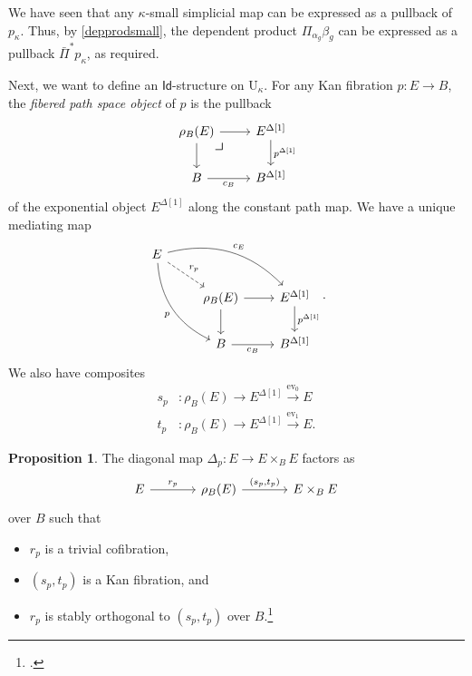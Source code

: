 \documentclass[10pt,letterpaper,cm]{nupset}
\theoremstyle{definition}
\theoremstyle{theorem}
\newtheorem{prop}[definition]{Proposition}
\theoremstyle{remark}
\DeclareMathOperator{\ev}{ev}
\newcommand{\id}{\mathsf{Id}}
\newcommand{\0}{\mathbf{0}}
\newcommand{\1}{\mathbf{1}}
\newcommand{\2}{\mathbf{2}}
\newcommand{\bi}{\begin{itemize}}
\newcommand{\ei}{\end{itemize}}
\begin{document}
We have seen that any $\kappa$-small simplicial map can be expressed as a pullback of $p_{\kappa}$. Thus, by \cref{depprodsmall}, the dependent product $\Pi_{\alpha_g}\beta_g$ can be expressed as a pullback $\bar{\Pi}^{\ast}{p_{\kappa}}$, as required.

\bigskip

Next, we want to define an $\id$-structure on $\mathrm{U}_{\kappa}$. For any Kan fibration $p:E \to B$, the \textit{fibered path space object} of $p$ is the pullback
\[
\begin{tikzcd}
\rho_B(E) \arrow[d] \arrow[r] 
\arrow[dr, phantom, "\scalebox{1.5}{\color{black}$\lrcorner$}" , very near start, color=black]
& 
{E^{\Delta[1]}} \arrow[d, "{p^{\Delta[1]}}"] \\
B \arrow[r, "c_B"']             & {B^{\Delta[1]}}                             
\end{tikzcd}
\] of the exponential object $E^{\Delta[1]}$ along the constant path map. We have a unique mediating map
\[
\begin{tikzcd}
E \arrow[rdd, "p"', bend right] \arrow[rrd, "c_E", bend left] \arrow[rd, "r_p", dashed]  &                               &                                              \\
                                                                                        & \rho_B(E) \arrow[d] \arrow[r] & {E^{\Delta[1]}} \arrow[d, "{p^{\Delta[1]}}"] \\
                                                                                        & B \arrow[r, "c_B"']           & {B^{\Delta[1]}}                             
\end{tikzcd}.
\] We also have composites 
\begin{align*}
s_p &: \rho_B(E) \to E^{\Delta[1]} \xrightarrow{\ev_0} E
\\ t_p &: \rho_B(E) \to E^{\Delta[1]} \xrightarrow{\ev_1} E.
\end{align*}

\begin{prop}\label{fibpathspace}
The diagonal map $\Delta_p : E \to E\times_B E$ factors as
\[
\begin{tikzcd}[column sep=large]
E \arrow[r, "r_p"] & \rho_B(E) \arrow[r, "{\left(s_p,t_p\right)}"] & E\times_BE
\end{tikzcd}
\] over $B$ such that
\bi
\item $r_p$ is a trivial cofibration, 
\item $\left(s_p,t_p\right)$ is a Kan fibration, and
\item $r_p$ is stably orthogonal to $\left(s_p,t_p\right)$ over $B$.\footnote{\autocite[Proposition 2.3.3]{KL}.}
\ei
\end{prop}
\end{document}
